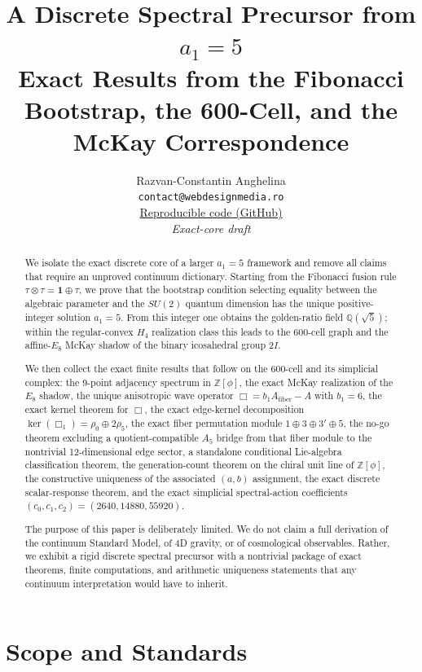 \documentclass[12pt,a4paper]{article}
\title{\textbf{A Discrete Spectral Precursor from $a_1 = 5$}\\
\large Exact Results from the Fibonacci Bootstrap, the 600-Cell, and the McKay Correspondence}
\author{
Razvan-Constantin Anghelina\\
\texttt{contact@webdesignmedia.ro}\\[0.3em]
\href{https://github.com/razvananghelina/One-Integer-Three-Generations}{Reproducible code (GitHub)}\\[1em]
\textit{Exact-core draft}
}
\date{}
\theoremstyle{definition}
\begin{document}
\maketitle

\begin{abstract}
We isolate the exact discrete core of a larger $a_1=5$ framework and remove all claims that require an unproved continuum dictionary.  Starting from the Fibonacci fusion rule $\tau \otimes \tau = \mathbf{1} \oplus \tau$, we prove that the bootstrap condition selecting equality between the algebraic parameter and the $SU(2)$ quantum dimension has the unique positive-integer solution $a_1=5$.  From this integer one obtains the golden-ratio field $\mathbb{Q}(\sqrt{5})$; within the regular-convex $H_4$ realization class this leads to the 600-cell graph and the affine-$E_8$ McKay shadow of the binary icosahedral group $2I$.

We then collect the exact finite results that follow on the 600-cell and its simplicial complex: the 9-point adjacency spectrum in $\mathbb{Z}[\phi]$, the exact McKay realization of the $E_8$ shadow, the unique anisotropic wave operator $\Box = b_1 A_{\mathrm{fiber}} - A$ with $b_1=6$, the exact kernel theorem for $\Box$, the exact edge-kernel decomposition $\ker(\Box_1)=\rho_0 \oplus 2\rho_5$, the exact fiber permutation module $1\oplus 3\oplus 3'\oplus 5$, the no-go theorem excluding a quotient-compatible $A_5$ bridge from that fiber module to the nontrivial 12-dimensional edge sector, a standalone conditional Lie-algebra classification theorem, the generation-count theorem on the chiral unit line of $\mathbb{Z}[\phi]$, the constructive uniqueness of the associated $(a,b)$ assignment, the exact discrete scalar-response theorem, and the exact simplicial spectral-action coefficients $(c_0,c_1,c_2)=(2640,14880,55920)$.

The purpose of this paper is deliberately limited.  We do not claim a full derivation of the continuum Standard Model, of 4D gravity, or of cosmological observables.  Rather, we exhibit a rigid discrete spectral precursor with a nontrivial package of exact theorems, finite computations, and arithmetic uniqueness statements that any continuum interpretation would have to inherit.
\end{abstract}

\tableofcontents
\newpage

\section{Scope and Standards}
\end{document}
